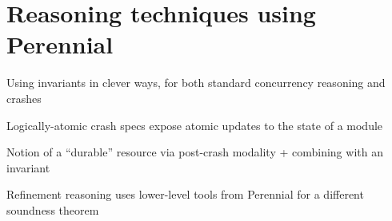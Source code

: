 \section{Reasoning techniques using Perennial}
\label{sec:perennial:techniques}

Using invariants in clever ways, for both standard concurrency reasoning and
crashes

Logically-atomic crash specs expose atomic updates to the state of a module

Notion of a ``durable'' resource via post-crash modality + combining with an
invariant

Refinement reasoning uses lower-level tools from Perennial for a different
soundness theorem
